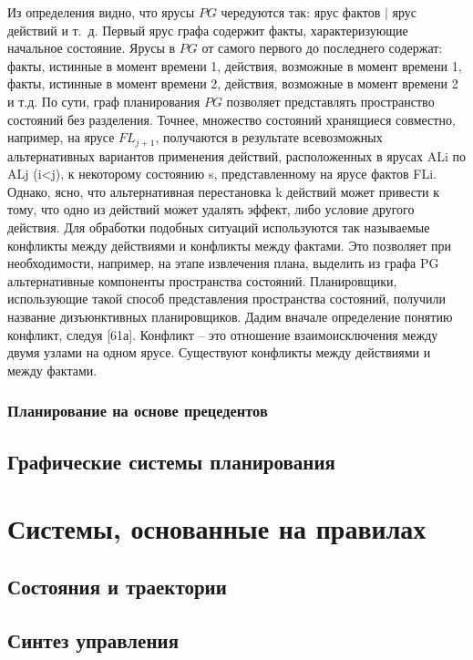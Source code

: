 \documentclass[b5paper,11pt]{book}
\begin{document}
	Из определения видно, что ярусы $PG$ чередуются так: ярус фактов $|$ ярус действий и т.~д. Первый ярус графа содержит факты, характеризующие начальное состояние. Ярусы в $PG$ от самого первого до последнего содержат: факты, истинные в момент времени 1, действия, возможные в момент времени 1, факты, истинные в момент времени 2, действия, возможные в момент времени 2 и т.д. По сути, граф планирования $PG$ позволяет представлять пространство состояний без разделения. Точнее, множество состояний хранящиеся совместно, например, на ярусе $FL_{j+1}$, получаются в результате всевозможных альтернативных вариантов применения действий, расположенных в ярусах ALi по ALj (i<j), к некоторому состоянию s, представленному на ярусе фактов FLi. Однако, ясно, что альтернативная перестановка k действий может привести к тому, что одно из действий может удалять эффект, либо условие другого действия. Для обработки подобных ситуаций используются так называемые  конфликты между действиями и конфликты между фактами. Это позволяет при необходимости, например, на этапе извлечения плана, выделить из графа PG альтернативные компоненты пространства состояний. Планировщики, использующие такой способ представления пространства состояний, получили название дизъюнктивных планировщиков. Дадим вначале определение понятию конфликт, следуя [61а]. Конфликт – это отношение взаимоисключения между двумя узлами на одном ярусе. Существуют конфликты между действиями и между фактами.
	
		
	\subsection{Планирование на основе прецедентов}
	
	\section{Графические системы планирования}
		
		
	
	\chapter{Системы, основанные на правилах}
	
	\section{Состояния и траектории}
	\section{Синтез управления}
\end{document}
